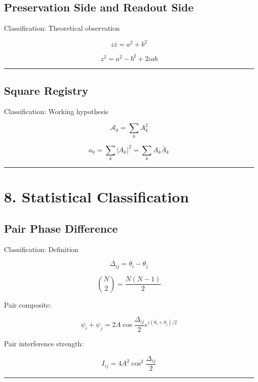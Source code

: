 \documentclass[
  a4paper,
]{article}
\begin{document}
\subsection{Preservation Side and Readout
Side}\label{preservation-side-and-readout-side}

Classification: Theoretical observation

\[
z\bar z=a^2+b^2
\]

\[
z^2=a^2-b^2+2iab
\]

\begin{center}\rule{0.5\linewidth}{0.5pt}\end{center}

\subsection{Square Registry}\label{square-registry}

Classification: Working hypothesis

\[
\mathcal{A}_0=\sum_k A_k^2
\]

\[
a_0=\sum_k |A_k|^2=\sum_k A_k\bar A_k
\]

\begin{center}\rule{0.5\linewidth}{0.5pt}\end{center}

\section{8. Statistical
Classification}\label{statistical-classification}

\subsection{Pair Phase Difference}\label{pair-phase-difference}

Classification: Definition

\[
\Delta_{ij}=\theta_i-\theta_j
\]

\[
\binom{N}{2}=\frac{N(N-1)}{2}
\]

Pair composite:

\[
\psi_i+\psi_j
=2A\cos\frac{\Delta_{ij}}{2}e^{i(\theta_i+\theta_j)/2}
\]

Pair interference strength:

\[
I_{ij}=4A^2\cos^2\frac{\Delta_{ij}}{2}
\]

\begin{center}\rule{0.5\linewidth}{0.5pt}\end{center}
\end{document}
